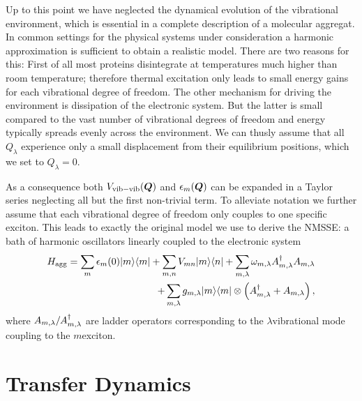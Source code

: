 
Up to this point we have neglected the dynamical evolution of the vibrational environment, which is essential in a complete description of a molecular aggregat.
In common settings for the physical systems under consideration a harmonic approximation is sufficient to obtain a realistic model.
There are two reasons for this:
First of all most proteins disintegrate at temperatures much higher than room temperature; therefore thermal excitation only leads to small energy gains for each vibrational degree of freedom.
The other mechanism for driving the environment is dissipation of the electronic system.
But the latter is small compared to the vast number of vibrational degrees of freedom and energy typically spreads evenly across the environment.
We can thusly assume that all $Q_\lambda$ experience only a small displacement from their equilibrium positions, which we set to $Q_\lambda = 0$.

As a consequence both $V_\mathrm{vib-vib}(\boldsymbol{Q})$ and $\epsilon_m(\boldsymbol{Q})$ can be expanded in a Taylor series neglecting all but the first non-trivial term.
To alleviate notation we further assume that each vibrational degree of freedom only couples to one specific exciton.
This leads to exactly the original model we use to derive the NMSSE: a bath of harmonic oscillators linearly coupled to the electronic system
\begin{align*}
  H_\mathrm{agg} =
  \sum_m \epsilon_m(0) | m \rangle\langle m | + \sum_{m,n} V_{mn} | m \rangle\langle n | + \sum_{m, \lambda} \omega_{m, \lambda} A^\dagger_{m, \lambda} A_{m, \lambda} \\
  + \sum_{m, \lambda} g_{m, \lambda} | m \rangle\langle m | \otimes \left( A^\dagger_{m, \lambda} + A_{m, \lambda} \right),
\end{align*}
where $A_{m, \lambda}/A^\dagger_{m, \lambda}$ are ladder operators corresponding to the $\lambda$\th vibrational mode coupling to the $m$\th exciton.


\section{Transfer Dynamics}
\label{sec:app.fmo}

